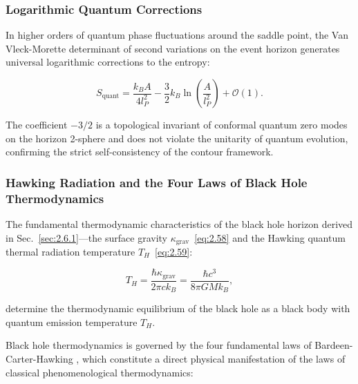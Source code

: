 \documentclass[11pt,a4paper]{article}
\theoremstyle{definition}
\begin{document}
\subsubsection{Logarithmic Quantum Corrections}\label{sec:2.6.3}

In higher orders of quantum phase fluctuations around the saddle point, the Van Vleck-Morette determinant of second variations on the event horizon generates universal logarithmic corrections to the entropy:

\begin{equation}\label{eq:2.68}\tag{2.68}
S_{\text{quant}} = \frac{k_B A}{4 l_P^2} - \frac{3}{2} k_B \ln\left( \frac{A}{l_P^2} \right) + \mathcal{O}(1).
\end{equation}

The coefficient $-3/2$ is a topological invariant of conformal quantum zero modes on the horizon 2-sphere and does not violate the unitarity of quantum evolution, confirming the strict self-consistency of the contour framework.

\subsubsection{Hawking Radiation and the Four Laws of Black Hole Thermodynamics}\label{sec:2.6.4}

The fundamental thermodynamic characteristics of the black hole horizon derived in Sec.~\ref{sec:2.6.1}---the surface gravity $\kappa_{\text{grav}}$~\eqref{eq:2.58} and the Hawking quantum thermal radiation temperature $T_H$~\eqref{eq:2.59}:

\begin{equation*}\label{eq:2.120}
T_H = \frac{\hbar \kappa_{\text{grav}}}{2\pi c k_B} = \frac{\hbar c^3}{8\pi G M k_B},
\end{equation*}

determine the thermodynamic equilibrium of the black hole as a black body with quantum emission temperature $T_H$.

Black hole thermodynamics is governed by the four fundamental laws of Bardeen-Carter-Hawking \cite{ref20}, which constitute a direct physical manifestation of the laws of classical phenomenological thermodynamics:
\end{document}
